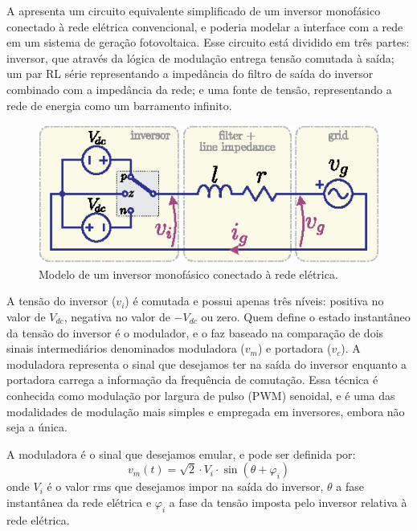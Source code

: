 A  apresenta um circuito equivalente simplificado de um inversor monofásico conectado à rede elétrica
convencional, e poderia modelar a interface com a rede em um sistema de geração fotovoltaica.
Esse circuito está dividido em três partes: inversor, que através da lógica de modulação entrega tensão comutada à
saída; um par RL série representando a impedância do filtro de saída
do inversor combinado com a impedância da rede; e uma fonte de tensão, representando a rede de energia como um
barramento infinito.
\begin{figure}[htbp]
    \centering
    \includegraphics{figs/inv.eps}
    \caption{Modelo de um inversor monofásico conectado à rede elétrica.}
    \label{fig:inv}
\end{figure}


A tensão do inversor ($v_i$) é comutada e possui apenas três níveis: positiva no valor de $V_{dc}$, negativa no valor
de $-V_{dc}$ ou zero.
Quem define o estado instantâneo da tensão do inversor é o modulador, e o faz baseado na comparação de dois sinais
intermediários denominados moduladora ($v_m$) e portadora ($v_c$).
A moduladora representa o sinal que desejamos ter na saída do inversor enquanto a portadora carrega a
informação da frequência de comutação.
Essa técnica é conhecida como modulação por largura de pulso (PWM) senoidal, e é uma das modalidades de modulação mais
simples e empregada em inversores, embora não seja a única.

A moduladora é o sinal que desejamos emular, e pode ser definida por:
\begin{equation}
    v_m(t) = \sqrt{2} \cdot V_i \cdot \sin(\theta + \varphi_i)
\end{equation}
onde $V_i$ é o valor rms que desejamos impor na saída do inversor, $\theta$ a fase instantânea da rede elétrica e
$\varphi_i$ a fase da tensão imposta pelo inversor relativa à rede elétrica.

